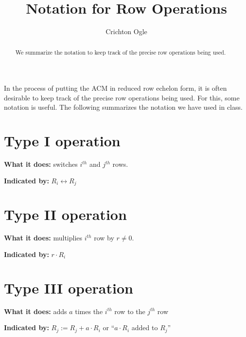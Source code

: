 \documentclass{ximera}
\author{Crichton Ogle}
\title{Notation for Row Operations}
\begin{document}
\begin{abstract}
  We summarize the notation to keep track of the precise row operations being used.
\end{abstract}
\maketitle

In the process of putting the ACM in reduced row echelon form, it is
often desirable to keep track of the precise row operations being
used. For this, some notation is useful. The following summarizes the
notation we have used in class.

\section{Type I operation}

\textbf{What it does:} switches $i^{th}$ and $j^{th}$ rows.

\textbf{Indicated by:} $R_i\leftrightarrow R_j$

\section{Type II operation}

\textbf{What it does:} multiplies $i^{th}$ row by $r\ne 0$.

\textbf{Indicated by:}  $r\cdot R_i$

\section{Type III operation}

\textbf{What it does:} adds $a$ times the $i^{th}$ row to the $j^{th}$ row

\textbf{Indicated by:} $R_j := R_j + a\cdot R_i$ or ``$a\cdot R_i$ added to $R_j$''
\end{document}
